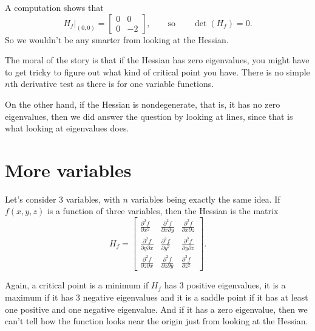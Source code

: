 \documentclass[12pt]{article}
\begin{document}
A computation shows that
\[
H_f\big|_{(0,0)} =
\begin{bmatrix}
0 & 0 \\
0 & -2
\end{bmatrix}
,
\qquad \text{so} \qquad
\det(H_f) = 0 .
\]
So we wouldn't be any smarter from looking at the Hessian.

The moral of the story is that if the Hessian has zero eigenvalues, you
might have to get tricky to figure out what kind of critical point you have.
There is no simple $n$th derivative test as there is for one variable functions.

On the other hand, if the Hessian is nondegenerate, that is, it has no
zero eigenvalues, then we did answer the question by looking at lines, since
that is what looking at eigenvalues does.

\section*{More variables}

Let's consider 3 variables, with $n$ variables being exactly the same
idea.
If $f(x,y,z)$ is a function of three variables, then
the Hessian is the matrix
\[
H_f
=
\begin{bmatrix}
\frac{\partial^2 f}{\partial x^2} &
\frac{\partial^2 f}{\partial x \partial y} &
\frac{\partial^2 f}{\partial x \partial z}
\\
\frac{\partial^2 f}{\partial y \partial x} &
\frac{\partial^2 f}{\partial y^2} &
\frac{\partial^2 f}{\partial y \partial z}
\\
\frac{\partial^2 f}{\partial z \partial x} &
\frac{\partial^2 f}{\partial z \partial y} &
\frac{\partial^2 f}{\partial z^2}
\end{bmatrix} .
\]

Again, a critical point is a minimum if $H_f$ has 3 positive eigenvalues, it
is a maximum if it has 3 negative eigenvalues and it is a saddle point if it
has at least one positive and one negative eigenvalue.  And if it has a
zero eigenvalue, then we can't tell how the function looks near the origin
just from looking at the Hessian.

\bigskip
\end{document}
